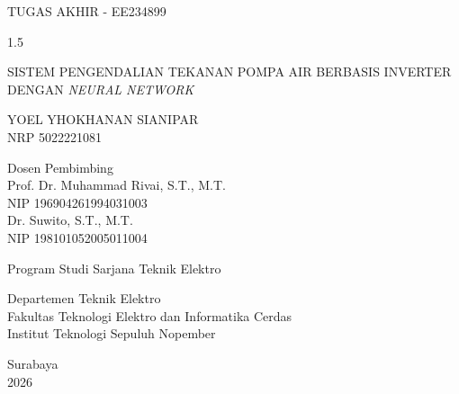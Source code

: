 \begin{large}
  TUGAS AKHIR - EE234899
\end{large}

\vspace{\fill}

\begin{spacing}{1.5}
  \begin{Large}
    SISTEM PENGENDALIAN TEKANAN POMPA AIR BERBASIS INVERTER DENGAN \emph{NEURAL NETWORK}
  \end{Large}
\end{spacing}

\vspace{\fill}

\begin{large}
  YOEL YHOKHANAN SIANIPAR \\
  \textmd{NRP 5022221081}
\end{large}

\vspace{\fill}

\begin{large}
  \textmd{Dosen Pembimbing} \\
  Prof. Dr. Muhammad Rivai, S.T., M.T. \\
  \textmd{NIP 196904261994031003} \\[1em]
  Dr. Suwito, S.T., M.T. \\
  \textmd{NIP 198101052005011004}
\end{large}

\vspace{\fill}

Program Studi Sarjana Teknik Elektro \\

\mdseries

Departemen Teknik Elektro \\
Fakultas Teknologi Elektro dan Informatika Cerdas \\
Institut Teknologi Sepuluh Nopember

Surabaya \\
2026
